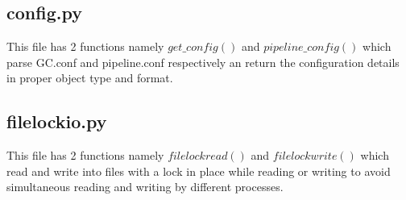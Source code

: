 \subsection{config.py}
This file has 2 functions namely $get\_config()$ and $pipeline\_config()$ which
parse GC.conf and pipeline.conf respectively an return the configuration
details in proper object type and format.


\subsection{filelockio.py}
This file has 2 functions namely $filelockread()$ and $filelockwrite()$ which read
and write into files with a lock in place while reading or writing to avoid
simultaneous reading and writing by different processes.


